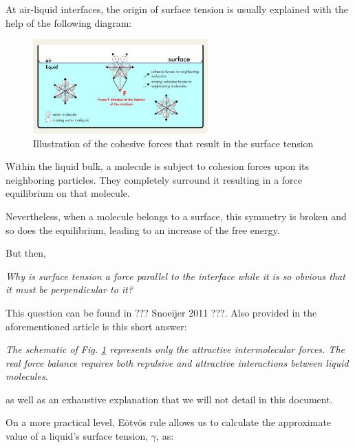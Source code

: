 At air-liquid interfaces, the origin of surface tension is usually explained with the help of the following diagram:

\begin{figure}[H]
	\centering
	\includegraphics[width=0.6\textwidth]{archivos/surface_tension.png}
	\caption[Caption for LOF]{Illustration of the cohesive forces that result in the surface tension\protect\footnotemark~\cite{sita-process}}
	\label{surface_tension}
\end{figure}


Within the liquid bulk, a molecule is subject to cohesion forces upon its neighboring particles. They completely surround it resulting in a force equilibrium on that molecule.

Nevertheless, when a molecule belongs to a surface, this symmetry is broken and so does the equilibrium, leading to an increase of the free energy.

But then, 

\begin{displayquote}
	\textit{Why is surface tension a force parallel to the interface while it is so obvious that it must be perpendicular to it?}
\end{displayquote}

This question can be found in ??? Snoeijer 2011 ???. Also provided in the aforementioned article is this short answer:

\begin{displayquote}
	\textit{The schematic of Fig. \ref{surface_tension} represents only the attractive intermolecular forces. The real force balance requires both repulsive and attractive interactions between liquid molecules.}
\end{displayquote}

as well as an exhaustive explanation that we will not detail in this document.  

On a more practical level, E\"{o}tv\"{o}s rule allows us to calculate the approximate value of a liquid's surface tension, $\gamma$, as:


